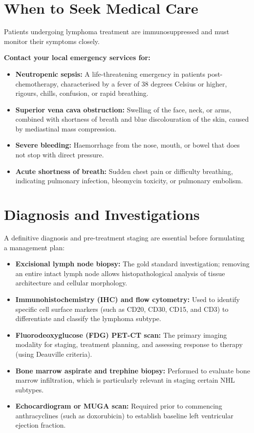 \section*{When to Seek Medical Care}
Patients undergoing lymphoma treatment are immunosuppressed and must monitor their symptoms closely.

\textbf{Contact your local emergency services for:}
\begin{itemize}
    \item \textbf{Neutropenic sepsis:} A life-threatening emergency in patients post-chemotherapy, characterised by a fever of 38 degrees Celsius or higher, rigours, chills, confusion, or rapid breathing.
    \item \textbf{Superior vena cava obstruction:} Swelling of the face, neck, or arms, combined with shortness of breath and blue discolouration of the skin, caused by mediastinal mass compression.
    \item \textbf{Severe bleeding:} Haemorrhage from the nose, mouth, or bowel that does not stop with direct pressure.
    \item \textbf{Acute shortness of breath:} Sudden chest pain or difficulty breathing, indicating pulmonary infection, bleomycin toxicity, or pulmonary embolism.
\end{itemize}

\section*{Diagnosis and Investigations}
A definitive diagnosis and pre-treatment staging are essential before formulating a management plan:
\begin{itemize}
    \item \textbf{Excisional lymph node biopsy:} The gold standard investigation; removing an entire intact lymph node allows histopathological analysis of tissue architecture and cellular morphology.
    \item \textbf{Immunohistochemistry (IHC) and flow cytometry:} Used to identify specific cell surface markers (such as CD20, CD30, CD15, and CD3) to differentiate and classify the lymphoma subtype.
    \item \textbf{Fluorodeoxyglucose (FDG) PET-CT scan:} The primary imaging modality for staging, treatment planning, and assessing response to therapy (using Deauville criteria).
    \item \textbf{Bone marrow aspirate and trephine biopsy:} Performed to evaluate bone marrow infiltration, which is particularly relevant in staging certain NHL subtypes.
    \item \textbf{Echocardiogram or MUGA scan:} Required prior to commencing anthracyclines (such as doxorubicin) to establish baseline left ventricular ejection fraction.
\end{itemize}

